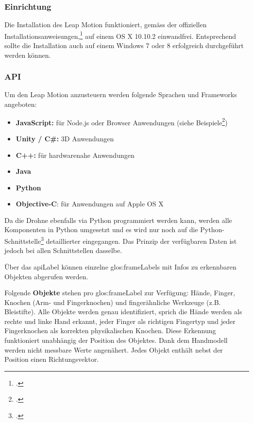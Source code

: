\subsubsection{Einrichtung}
Die Installation des Leap Motion funktioniert, gemäss der offiziellen Installationsanweisungen,\footcite{Getting_Started_Leap_Motion_Developers_2015-03-28} auf einem OS X 10.10.2 einwandfrei.
Entsprechend sollte  die Installation auch auf einem Windows 7 oder 8 erfolgreich durchgeführt werden können.

\subsubsection{API}
\label{subsec:leapmotion:api}
Um den Leap Motion anzusteuern werden folgende Sprachen und Frameworks angeboten:
\begin{itemize}
	\item \textbf{JavaScript:} für Node.js oder Browser Anwendungen (siehe Beispiele\footcite{Getting_Started_Leap_Motion_Developers_2015-03-28})
	\item \textbf{Unity / C\#:} 3D Anwendungen
	\item \textbf{C++:} für hardwarenahe Anwendungen
	\item \textbf{Java}
	\item \textbf{Python}
	\item \textbf{Objective-C}: für Anwendungen auf Apple OS X
\end{itemize}

Da die Drohne ebenfalls via Python programmiert werden kann, werden alle Komponenten in Python umgesetzt und es wird nur noch auf die Python-Schnittstelle\footcite{Python_SDK_Documentation__Leap_Motion_Python_SDK_v2.2_documentation_2015-03-28} detaillierter eingegangen. Das Prinzip der verfügbaren Daten ist jedoch bei allen Schnittstellen dasselbe.

Über das \gls{apiLabel} können einzelne \glspl{glos:frameLabel} mit Infos zu erkennbaren Objekten abgerufen werden.

Folgende \textbf{Objekte} stehen pro \gls{glos:frameLabel} zur Verfügung: Hände, Finger, Knochen (Arm- und Fingerknochen) und fingerähnliche Werkzeuge (z.B. Bleistifte).
Alle Objekte werden genau identifiziert, sprich die Hände werden als rechte und linke Hand erkannt, jeder Finger als richtigen Fingertyp und jeder Fingerknochen als korrekten physikalischen Knochen. Diese Erkennung funktioniert unabhängig der Position des Objektes. Dank dem Handmodell werden nicht messbare Werte angenähert.
Jedes Objekt enthält nebst der Position einen Richtungsvektor.

